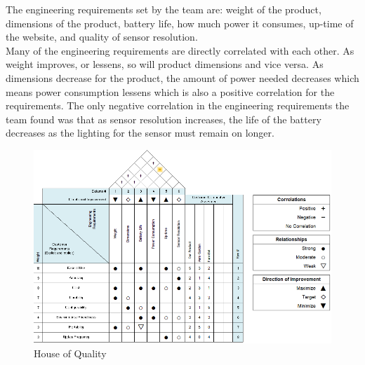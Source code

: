 The engineering requirements set by the team are: weight of the product, dimensions of the product, battery life, how much power it consumes, up-time of the website, and quality of sensor resolution. \\

Many of the engineering requirements are directly correlated with each other. As weight improves, or lessens, so will product dimensions and vice versa. As dimensions decrease for the product, the amount of power needed decreases which means power consumption lessens which is also a positive correlation for the requirements. The only negative correlation in the engineering requirements the team found was that as sensor resolution increases, the life of the battery decreases as the lighting for the sensor must remain on longer. \\
 

\begin{figure}[H]
    \centering
    \caption{House of Quality}
    \includegraphics[width=\textwidth]{images/HouseOfQuality.PNG}
\end{figure}

